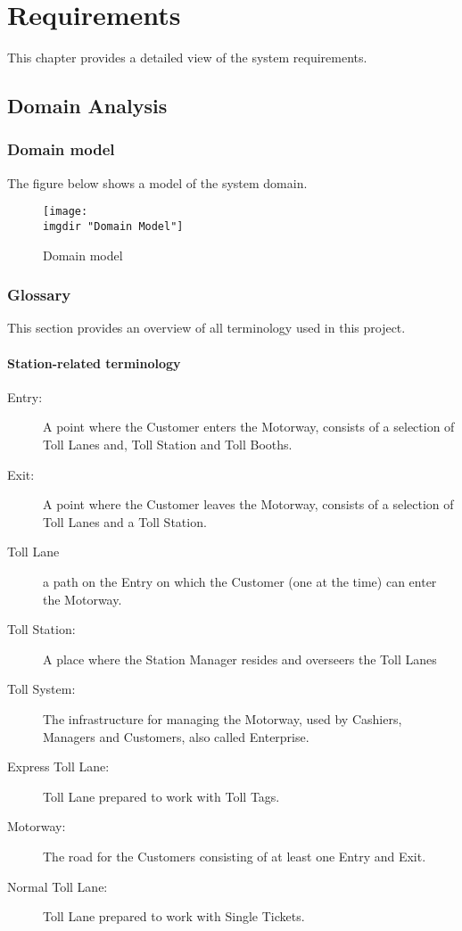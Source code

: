 \chapter{Requirements}
\noindent
This chapter provides a detailed view of the system requirements.

\section{Domain Analysis}

\subsection{Domain model}
The figure below shows a model of the system domain.
\begin{figure}[H]
\texttt{[image: \\imgdir "Domain Model"]}
\caption{Domain model}
\label{fig:domain_model}
\end{figure}

\subsection{Glossary}
This section provides an overview of all terminology used in this project.
\subsubsection{Station-related terminology}
\begin{description}
  \item[Entry:] A point where the Customer enters the Motorway, consists of a selection of Toll Lanes and, Toll Station and Toll Booths.
  \item[Exit:] A point where the Customer leaves the Motorway, consists of a selection of Toll Lanes and a Toll Station.
    \item[Toll Lane] a path on the Entry on which the Customer (one at the time) can enter the Motorway.
  \item[Toll Station:] A place where the Station Manager resides and overseers the Toll Lanes
  \item[Toll System:] The infrastructure for managing the Motorway, used by Cashiers, Managers and Customers, also called Enterprise.
  \item[Express Toll Lane:] Toll Lane prepared to work with Toll Tags.
  \item[Motorway:] The road for the Customers consisting of at least one Entry and Exit.
  \item[Normal Toll Lane:] Toll Lane prepared to work with Single Tickets.

\end{description}
